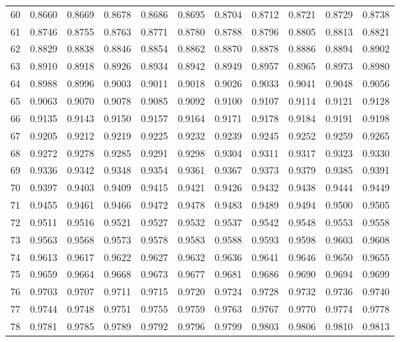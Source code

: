 {\begin{tabular}{|c|cccccccccc|}
\hline
60 & 0.8660 & 0.8669 & 0.8678 & 0.8686 & 0.8695 & 0.8704 & 0.8712 & 0.8721 & 0.8729 & 0.8738 \\
61 & 0.8746 & 0.8755 & 0.8763 & 0.8771 & 0.8780 & 0.8788 & 0.8796 & 0.8805 & 0.8813 & 0.8821 \\
62 & 0.8829 & 0.8838 & 0.8846 & 0.8854 & 0.8862 & 0.8870 & 0.8878 & 0.8886 & 0.8894 & 0.8902 \\
63 & 0.8910 & 0.8918 & 0.8926 & 0.8934 & 0.8942 & 0.8949 & 0.8957 & 0.8965 & 0.8973 & 0.8980 \\
64 & 0.8988 & 0.8996 & 0.9003 & 0.9011 & 0.9018 & 0.9026 & 0.9033 & 0.9041 & 0.9048 & 0.9056 \\
\hline
65 & 0.9063 & 0.9070 & 0.9078 & 0.9085 & 0.9092 & 0.9100 & 0.9107 & 0.9114 & 0.9121 & 0.9128 \\
66 & 0.9135 & 0.9143 & 0.9150 & 0.9157 & 0.9164 & 0.9171 & 0.9178 & 0.9184 & 0.9191 & 0.9198 \\
67 & 0.9205 & 0.9212 & 0.9219 & 0.9225 & 0.9232 & 0.9239 & 0.9245 & 0.9252 & 0.9259 & 0.9265 \\
68 & 0.9272 & 0.9278 & 0.9285 & 0.9291 & 0.9298 & 0.9304 & 0.9311 & 0.9317 & 0.9323 & 0.9330 \\
69 & 0.9336 & 0.9342 & 0.9348 & 0.9354 & 0.9361 & 0.9367 & 0.9373 & 0.9379 & 0.9385 & 0.9391 \\
\hline
70 & 0.9397 & 0.9403 & 0.9409 & 0.9415 & 0.9421 & 0.9426 & 0.9432 & 0.9438 & 0.9444 & 0.9449 \\
71 & 0.9455 & 0.9461 & 0.9466 & 0.9472 & 0.9478 & 0.9483 & 0.9489 & 0.9494 & 0.9500 & 0.9505 \\
72 & 0.9511 & 0.9516 & 0.9521 & 0.9527 & 0.9532 & 0.9537 & 0.9542 & 0.9548 & 0.9553 & 0.9558 \\
73 & 0.9563 & 0.9568 & 0.9573 & 0.9578 & 0.9583 & 0.9588 & 0.9593 & 0.9598 & 0.9603 & 0.9608 \\
74 & 0.9613 & 0.9617 & 0.9622 & 0.9627 & 0.9632 & 0.9636 & 0.9641 & 0.9646 & 0.9650 & 0.9655 \\
\hline
75 & 0.9659 & 0.9664 & 0.9668 & 0.9673 & 0.9677 & 0.9681 & 0.9686 & 0.9690 & 0.9694 & 0.9699 \\
76 & 0.9703 & 0.9707 & 0.9711 & 0.9715 & 0.9720 & 0.9724 & 0.9728 & 0.9732 & 0.9736 & 0.9740 \\
77 & 0.9744 & 0.9748 & 0.9751 & 0.9755 & 0.9759 & 0.9763 & 0.9767 & 0.9770 & 0.9774 & 0.9778 \\
78 & 0.9781 & 0.9785 & 0.9789 & 0.9792 & 0.9796 & 0.9799 & 0.9803 & 0.9806 & 0.9810 & 0.9813 \\

\end{tabular}}
